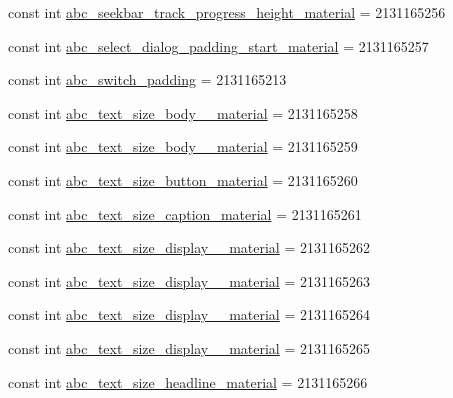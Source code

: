 \begin{DoxyCompactItemize}
const int \mbox{\hyperlink{class_f_w_p_s___app_1_1_droid_1_1_resource_1_1_dimension_a3ceb1fc2257d219762a547e65425a320}{abc\+\_\+seekbar\+\_\+track\+\_\+progress\+\_\+height\+\_\+material}} = 2131165256
\item 
const int \mbox{\hyperlink{class_f_w_p_s___app_1_1_droid_1_1_resource_1_1_dimension_a2b2172672fd72140614df639dbb31e67}{abc\+\_\+select\+\_\+dialog\+\_\+padding\+\_\+start\+\_\+material}} = 2131165257
\item 
const int \mbox{\hyperlink{class_f_w_p_s___app_1_1_droid_1_1_resource_1_1_dimension_a5173ce9679ee92044dcfcda392e445b2}{abc\+\_\+switch\+\_\+padding}} = 2131165213
\item 
const int \mbox{\hyperlink{class_f_w_p_s___app_1_1_droid_1_1_resource_1_1_dimension_aafa223a54c510c7c386d5dd51905eb6d}{abc\+\_\+text\+\_\+size\+\_\+body\+\_\+\_\+material}} = 2131165258
\item 
const int \mbox{\hyperlink{class_f_w_p_s___app_1_1_droid_1_1_resource_1_1_dimension_a58f8d6eb114b9c602103993f6de7b237}{abc\+\_\+text\+\_\+size\+\_\+body\+\_\+\_\+material}} = 2131165259
\item 
const int \mbox{\hyperlink{class_f_w_p_s___app_1_1_droid_1_1_resource_1_1_dimension_a2cd4d0de8963fe1f94ca13bf9998524d}{abc\+\_\+text\+\_\+size\+\_\+button\+\_\+material}} = 2131165260
\item 
const int \mbox{\hyperlink{class_f_w_p_s___app_1_1_droid_1_1_resource_1_1_dimension_a01703b419ed3026daf3e5c63f6341de7}{abc\+\_\+text\+\_\+size\+\_\+caption\+\_\+material}} = 2131165261
\item 
const int \mbox{\hyperlink{class_f_w_p_s___app_1_1_droid_1_1_resource_1_1_dimension_adaf565bcc7392551ffa9874c190e4694}{abc\+\_\+text\+\_\+size\+\_\+display\+\_\+\_\+material}} = 2131165262
\item 
const int \mbox{\hyperlink{class_f_w_p_s___app_1_1_droid_1_1_resource_1_1_dimension_a07d2efae81819bdf9159c6f031dc9b45}{abc\+\_\+text\+\_\+size\+\_\+display\+\_\+\_\+material}} = 2131165263
\item 
const int \mbox{\hyperlink{class_f_w_p_s___app_1_1_droid_1_1_resource_1_1_dimension_a15c8c2c8adedafe8b71866d4dfd38919}{abc\+\_\+text\+\_\+size\+\_\+display\+\_\+\_\+material}} = 2131165264
\item 
const int \mbox{\hyperlink{class_f_w_p_s___app_1_1_droid_1_1_resource_1_1_dimension_a0b118c06d634ace92420a18942860eb6}{abc\+\_\+text\+\_\+size\+\_\+display\+\_\+\_\+material}} = 2131165265
\item 
const int \mbox{\hyperlink{class_f_w_p_s___app_1_1_droid_1_1_resource_1_1_dimension_af71f9d7de4b21e574a34e484d91f4c77}{abc\+\_\+text\+\_\+size\+\_\+headline\+\_\+material}} = 2131165266

\end{DoxyCompactItemize}
